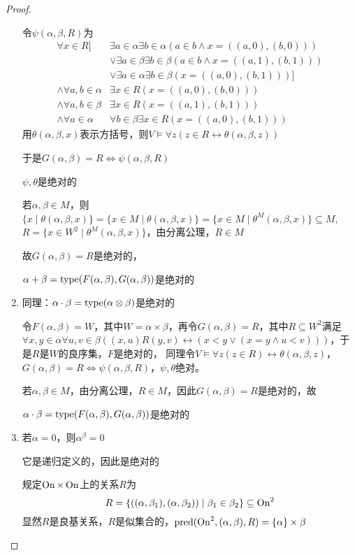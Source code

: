 \documentclass[11pt]{article}
\begin{document}
\begin{proof}
\begin{enumerate}
令\(\psi(\alpha,\beta,R)\)为
\begin{align*}
\forall x\in R[&\exists a\in\alpha\exists b\in\alpha(a\in b\wedge x=((a,0),(b,0)))\\
&\vee\exists a\in\beta\exists b\in\beta(a\in b\wedge x=((a,1),(b,1)))\\
&\vee\exists a\in\alpha\exists b\in\beta(x=((a,0),(b,1)))]\\
\wedge\forall a,b\in\alpha&\exists x\in R(x=((a,0),(b,0)))\\
\wedge\forall a,b\in\beta&\exists x\in R(x=((a,1),(b,1)))\\
\wedge\forall a\in\alpha&\forall b\in\beta\exists x\in R(x=((a,0),(b,1)))
\end{align*}
用\(\theta(\alpha,\beta,x)\)表示方括号，则\(V\vDash\forall z(z\in R\leftrightarrow\theta(\alpha,\beta,z))\)

于是\(G(\alpha,\beta)=R\Leftrightarrow\psi(\alpha,\beta,R)\)

\(\psi,\theta\)是绝对的

若\(\alpha,\beta\in M\)，则\(\{x\mid\theta(\alpha,\beta,x)\}=\{x\in M\mid\theta(\alpha,\beta,x)\}=\{x\in M\mid\theta^M(\alpha,\beta,x)\}\subseteq M\),
\(R=\{x\in W^2\mid\theta^M(\alpha,\beta,x)\}\)，由分离公理，\(R\in M\)

故\(G(\alpha,\beta)=R\)是绝对的，

\(\alpha+\beta=\operatorname{type}(F(\alpha,\beta),G(\alpha,\beta))\)是绝对的
\item 同理：\(\alpha\cdot\beta=\operatorname{type}(\alpha\otimes\beta)\)是绝对的

令\(F(\alpha,\beta)=W\)，其中\(W=\alpha\times\beta\)，再令\(G(\alpha,\beta)=R\)，其中\(R\subseteq W^2\)满足
\(\forall x,y\in\alpha\forall u,v\in\beta((x,u)R(y,v)\leftrightarrow(x<y\vee(x=y\wedge u<v)))\)，于是\(R\)是\(W\)的良序集，\(F\)是绝对的，
同理令\(V\vDash\forall z(z\in R)\leftrightarrow\theta(\alpha,\beta,z)\)，\(G(\alpha,\beta)=R\Leftrightarrow\psi(\alpha,\beta,R)\)，\(\psi,\theta\)绝对。

若\(\alpha,\beta\in M\)，由分离公理，\(R\in M\)，因此\(G(\alpha,\beta)=R\)是绝对的，故

\(\alpha\cdot\beta=\operatorname{type}(F(\alpha,\beta),G(\alpha,\beta))\)是绝对的
\item 若\(\alpha=0\)，则\(\alpha^\beta=0\)

它是递归定义的，因此是绝对的

规定\(\operatorname{On}\times\operatorname{On}\)上的关系\(R\)为
\begin{equation*}
R=\{((\alpha,\beta_1),(\alpha,\beta_2))\mid\beta_1\in\beta_2\}\subseteq\operatorname{On}^2
\end{equation*}
显然\(R\)是良基关系，\(R\)是似集合的，\(\text{pred}(\operatorname{On}^2,(\alpha,\beta),R)=\{\alpha\}\times\beta\)


\end{enumerate}
\end{proof}
\end{document}
